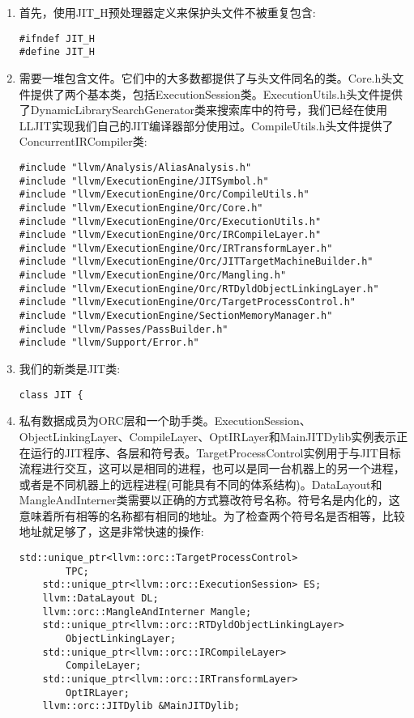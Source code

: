\begin{enumerate}
\item 首先，使用JIT\underline{~}H预处理器定义来保护头文件不被重复包含:
\begin{lstlisting}[caption={}]
#ifndef JIT_H
#define JIT_H
\end{lstlisting}

\item 需要一堆包含文件。它们中的大多数都提供了与头文件同名的类。Core.h头文件提供了两个基本类，包括ExecutionSession类。ExecutionUtils.h头文件提供了DynamicLibrarySearch\allowbreak Generator类来搜索库中的符号，我们已经在使用LLJIT实现我们自己的JIT编译器部分使用过。CompileUtils.h头文件提供了ConcurrentIRCompiler类:
\begin{lstlisting}[caption={}]
#include "llvm/Analysis/AliasAnalysis.h"
#include "llvm/ExecutionEngine/JITSymbol.h"
#include "llvm/ExecutionEngine/Orc/CompileUtils.h"
#include "llvm/ExecutionEngine/Orc/Core.h"
#include "llvm/ExecutionEngine/Orc/ExecutionUtils.h"
#include "llvm/ExecutionEngine/Orc/IRCompileLayer.h"
#include "llvm/ExecutionEngine/Orc/IRTransformLayer.h"
#include "llvm/ExecutionEngine/Orc/JITTargetMachineBuilder.h"
#include "llvm/ExecutionEngine/Orc/Mangling.h"
#include "llvm/ExecutionEngine/Orc/RTDyldObjectLinkingLayer.h"
#include "llvm/ExecutionEngine/Orc/TargetProcessControl.h"
#include "llvm/ExecutionEngine/SectionMemoryManager.h"
#include "llvm/Passes/PassBuilder.h"
#include "llvm/Support/Error.h"
\end{lstlisting}

\item 我们的新类是JIT类:
\begin{lstlisting}[caption={}]
class JIT {
\end{lstlisting}

\item 私有数据成员为ORC层和一个助手类。ExecutionSession、ObjectLinkingLayer、CompileLayer、OptIRLayer和MainJITDylib实例表示正在运行的JIT程序、各层和符号表。TargetProcess\allowbreak Control实例用于与JIT目标流程进行交互，这可以是相同的进程，也可以是同一台机器上的另一个进程，或者是不同机器上的远程进程(可能具有不同的体系结构)。DataLayout和MangleAnd\allowbreak Interner类需要以正确的方式篡改符号名称。符号名是内化的，这意味着所有相等的名称都有相同的地址。为了检查两个符号名是否相等，比较地址就足够了，这是非常快速的操作:
\begin{lstlisting}[caption={}]
	std::unique_ptr<llvm::orc::TargetProcessControl> 
		TPC;
	std::unique_ptr<llvm::orc::ExecutionSession> ES;
	llvm::DataLayout DL;
	llvm::orc::MangleAndInterner Mangle;
	std::unique_ptr<llvm::orc::RTDyldObjectLinkingLayer>
		ObjectLinkingLayer;
	std::unique_ptr<llvm::orc::IRCompileLayer>
		CompileLayer;
	std::unique_ptr<llvm::orc::IRTransformLayer>
		OptIRLayer;
	llvm::orc::JITDylib &MainJITDylib;
\end{lstlisting}


\end{enumerate}
